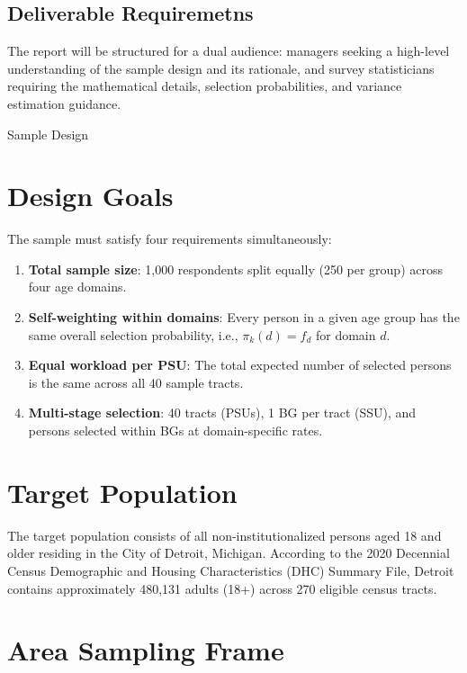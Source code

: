 \documentclass[
  12pt]{article}
\providecommand{\tightlist}{%
  \setlength{\itemsep}{0pt}\setlength{\parskip}{0pt}}
\begin{document}
\subsection{Deliverable Requiremetns}\label{deliverable-requiremetns}

The report will be structured for a dual audience: managers seeking a
high-level understanding of the sample design and its rationale, and
survey statisticians requiring the mathematical details, selection
probabilities, and variance estimation guidance.

Sample Design

\section{Design Goals}\label{design-goals-1}

The sample must satisfy four requirements simultaneously:

\begin{enumerate}
\def\labelenumi{\arabic{enumi}.}
\tightlist
\item
  \textbf{Total sample size}: 1,000 respondents split equally (250 per
  group) across four age domains.
\item
  \textbf{Self-weighting within domains}: Every person in a given age
  group has the same overall selection probability, i.e.,
  \(\pi_k(d) = f_d\) for domain \(d\).
\item
  \textbf{Equal workload per PSU}: The total expected number of selected
  persons is the same across all 40 sample tracts.
\item
  \textbf{Multi-stage selection}: 40 tracts (PSUs), 1 BG per tract
  (SSU), and persons selected within BGs at domain-specific rates.
\end{enumerate}

\section{Target Population}\label{target-population}

The target population consists of all non-institutionalized persons aged
18 and older residing in the City of Detroit, Michigan. According to the
2020 Decennial Census Demographic and Housing Characteristics (DHC)
Summary File, Detroit contains approximately 480,131 adults (18+) across
270 eligible census tracts.

\section{Area Sampling Frame}\label{sec-frame}
\end{document}
